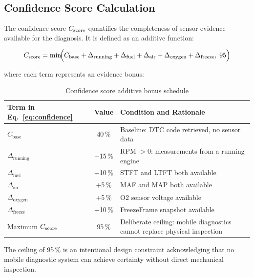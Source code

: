 \subsection{Confidence Score Calculation}
\label{subsec:confidence}

The confidence score $C_{\mathrm{score}}$ quantifies the completeness of sensor evidence available for the diagnosis.
It is defined as an additive function:

\begin{equation}
\label{eq:confidence}
C_{\mathrm{score}} = \min\!\Bigl(
  C_{\mathrm{base}}
  + \Delta_{\mathrm{running}}
  + \Delta_{\mathrm{fuel}}
  + \Delta_{\mathrm{air}}
  + \Delta_{\mathrm{oxygen}}
  + \Delta_{\mathrm{freeze}},\;
  95
\Bigr)
\end{equation}

\noindent where each term represents an evidence bonus:

\begin{table}[!htbp]
\centering
\caption{Confidence score additive bonus schedule}
\label{tab:confidence}
\begin{tabularx}{0.95\linewidth}{p{3.2cm} c X}
\toprule
\rowcolor{tblhdr}
\color{white}\textbf{Term in Eq.~\ref{eq:confidence}} &
\color{white}\textbf{Value} &
\color{white}\textbf{Condition and Rationale} \\
\midrule
$C_{\mathrm{base}}$           & 40\,\% & Baseline: DTC code retrieved, no sensor data \\
$\Delta_{\mathrm{running}}$   & +15\,\% & RPM $> 0$: measurements from a running engine \\
$\Delta_{\mathrm{fuel}}$      & +10\,\% & STFT and LTFT both available \\
$\Delta_{\mathrm{air}}$       & +5\,\%  & MAF and MAP both available \\
$\Delta_{\mathrm{oxygen}}$    & +5\,\%  & O2 sensor voltage available \\
$\Delta_{\mathrm{freeze}}$    & +10\,\% & FreezeFrame snapshot available \\
Maximum $C_{\mathrm{score}}$               & 95\,\%  & Deliberate ceiling: mobile diagnostics cannot replace physical inspection \\
\bottomrule
\end{tabularx}
\end{table}

The ceiling of 95\,\% is an intentional design constraint acknowledging that no mobile diagnostic system can achieve certainty without direct mechanical inspection.

